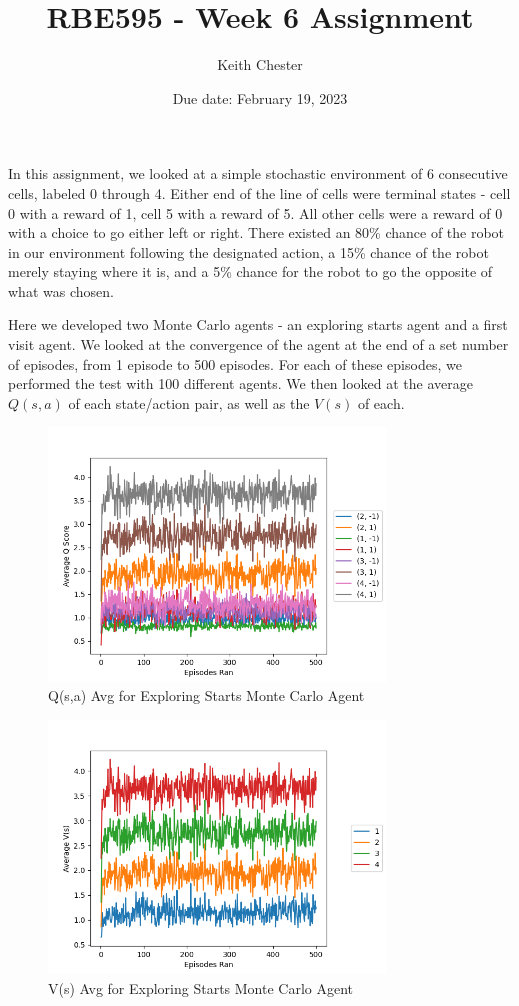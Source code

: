 \documentclass{article}
\title{RBE595 - Week 6 Assignment}
\author{Keith Chester}
\date{Due date: February 19, 2023}
\begin{document}
\maketitle

In this assignment, we looked at a simple stochastic environment of 6 consecutive cells, labeled 0 through 4. Either end of the line of cells were terminal states - cell 0 with a reward of 1, cell 5 with a reward of 5. All other cells were a reward of 0 with a choice to go either left or right. There existed an 80\% chance of the robot in our environment following the designated action, a 15\% chance of the robot merely staying where it is, and a 5\% chance for the robot to go the opposite of what was chosen.

Here we developed two Monte Carlo agents - an exploring starts agent and a first visit agent. We looked at the convergence of the agent at the end of a set number of episodes, from 1 episode to 500 episodes. For each of these episodes, we performed the test with 100 different agents. We then looked at the average $Q(s,a)$ of each state/action pair, as well as the $V(s)$ of each.

\begin{figure}
    \centering
    \includegraphics[width = 0.8\textwidth]{results_exploring_start_q.png}
    \caption{Q(s,a) Avg for Exploring Starts Monte Carlo Agent}
\end{figure}

\begin{figure}
    \centering
    \includegraphics[width = 0.8\textwidth]{results_exploring_start_v.png}
    \caption{V(s) Avg for Exploring Starts Monte Carlo Agent}
\end{figure}
\end{document}
